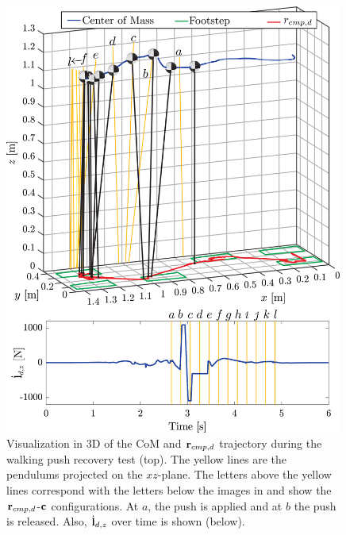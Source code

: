 \begin{figure}
     \centering
        \includegraphics[width=0.99\textwidth]{STYLESTUFF/walk3D2.png}
        \caption{Visualization in \ac{3D} of the \ac{CoM} and $\mathbf{r}_{cmp,d}$ trajectory during the walking push recovery test (top). The yellow lines are the pendulums projected on the $xz$-plane. The letters above the yellow lines correspond with the letters below the images in  and show the $\mathbf{r}_{cmp,d}$-$\mathbf{c}$ configurations. At $a$, the push is applied and at $b$ the push is released. Also, $\dot{\mathbf{l}}_{d,z}$ over time is shown (below).}
        \label{fig:walk3D}
\end{figure}

